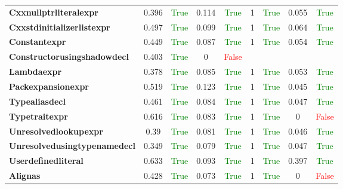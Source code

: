 \documentclass{article}
\begin{document}
\begin{xltabular}{\textwidth}{lcccccccc}
\textbf{{\fontsize{10}{12}\selectfont Cxxnullptrliteralexpr}}& 0.396&\textcolor{green}{True}& 0.114&\textcolor{green}{True}& 1&\textcolor{green}{True}& 0.055&\textcolor{green}{True} \\[0.5ex]
\textbf{{\fontsize{10}{12}\selectfont Cxxstdinitializerlistexpr}}& 0.497&\textcolor{green}{True}& 0.099&\textcolor{green}{True}& 1&\textcolor{green}{True}& 0.064&\textcolor{green}{True} \\[0.5ex]
\textbf{{\fontsize{10}{12}\selectfont Constantexpr}}& 0.449&\textcolor{green}{True}& 0.087&\textcolor{green}{True}& 1&\textcolor{green}{True}& 0.054&\textcolor{green}{True} \\[0.5ex]
\textbf{{\fontsize{10}{12}\selectfont Constructorusingshadowdecl}}& 0.403&\textcolor{green}{True}& 0&\textcolor{red}{False} \\[0.5ex]
\textbf{{\fontsize{10}{12}\selectfont Lambdaexpr}}& 0.378&\textcolor{green}{True}& 0.085&\textcolor{green}{True}& 1&\textcolor{green}{True}& 0.053&\textcolor{green}{True} \\[0.5ex]
\textbf{{\fontsize{10}{12}\selectfont Packexpansionexpr}}& 0.519&\textcolor{green}{True}& 0.123&\textcolor{green}{True}& 1&\textcolor{green}{True}& 0.045&\textcolor{green}{True} \\[0.5ex]
\textbf{{\fontsize{10}{12}\selectfont Typealiasdecl}}& 0.461&\textcolor{green}{True}& 0.084&\textcolor{green}{True}& 1&\textcolor{green}{True}& 0.047&\textcolor{green}{True} \\[0.5ex]
\textbf{{\fontsize{10}{12}\selectfont Typetraitexpr}}& 0.616&\textcolor{green}{True}& 0.083&\textcolor{green}{True}& 1&\textcolor{green}{True}& 0&\textcolor{red}{False} \\[0.5ex]
\textbf{{\fontsize{10}{12}\selectfont Unresolvedlookupexpr}}& 0.39&\textcolor{green}{True}& 0.081&\textcolor{green}{True}& 1&\textcolor{green}{True}& 0.046&\textcolor{green}{True} \\[0.5ex]
\textbf{{\fontsize{10}{12}\selectfont Unresolvedusingtypenamedecl}}& 0.349&\textcolor{green}{True}& 0.079&\textcolor{green}{True}& 1&\textcolor{green}{True}& 0.047&\textcolor{green}{True} \\[0.5ex]
\textbf{{\fontsize{10}{12}\selectfont Userdefinedliteral}}& 0.633&\textcolor{green}{True}& 0.093&\textcolor{green}{True}& 1&\textcolor{green}{True}& 0.397&\textcolor{green}{True} \\[0.5ex]
\textbf{{\fontsize{10}{12}\selectfont Alignas}}& 0.428&\textcolor{green}{True}& 0.073&\textcolor{green}{True}& 1&\textcolor{green}{True}& 0&\textcolor{red}{False} \\[0.5ex]

\end{xltabular}
\end{document}
